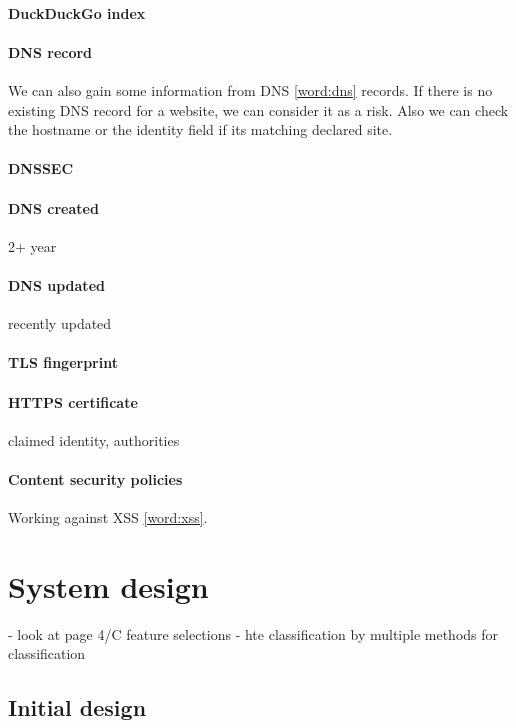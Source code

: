 \documentclass[
  digital, %
  oneside, %
  table,   %
  nolof,     %
  nolot,     %
]{fithesis3}
\newcounter{feature}
\begin{document}
\subsubsection{DuckDuckGo index}

\subsubsection{DNS record}

We can also gain some information from DNS \ref{word:dns} records. If there is no existing DNS record for a website, we can consider it as a risk. Also we can check the hostname or the identity field if its matching declared site.

\subsubsection{DNSSEC}

\subsubsection{DNS created} 2+ year
\subsubsection{DNS updated} recently updated
\subsubsection{TLS fingerprint}
\subsubsection{HTTPS certificate} claimed identity, authorities
\subsubsection{Content security policies} Working against XSS \ref{word:xss}.


\chapter{System design}

\cite{methodical overview}
- look at page 4/C feature selections
- hte classification by multiple methods for classification
\section{Initial design}
\end{document}
